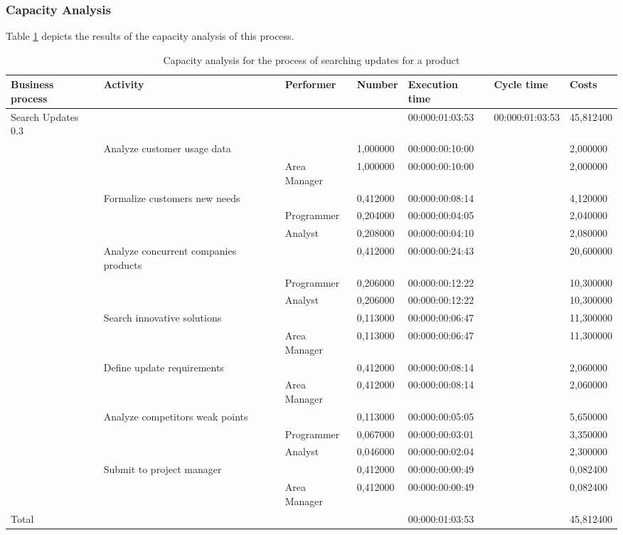 \subsubsection{Capacity Analysis}
Table \ref{2tab:updates} depicts the results of the capacity analysis of
this process.
\begin{landscape}
\centering
\begin{table}
{\tiny
\begin{tabular}{|l|l|l|l|l|l|l|}
Business process&Activity&Performer&Number&Execution time&Cycle
time&Costs\\
\hline
Search Updates 0.3&&&&00:000:01:03:53&00:000:01:03:53&45,812400\\
\hline
&Analyze customer usage data &&1,000000&00:000:00:10:00&&2,000000\\
\hline
&&Area Manager &1,000000&00:000:00:10:00&&2,000000\\
\hline
&Formalize customers new needs &&0,412000&00:000:00:08:14&&4,120000\\
\hline
&&Programmer &0,204000&00:000:00:04:05&&2,040000\\
\hline
&&Analyst &0,208000&00:000:00:04:10&&2,080000\\
\hline
&Analyze concurrent companies products &&0,412000&00:000:00:24:43&&20,600000\\
\hline
&&Programmer &0,206000&00:000:00:12:22&&10,300000\\
\hline
&&Analyst &0,206000&00:000:00:12:22&&10,300000\\
\hline
&Search innovative solutions &&0,113000&00:000:00:06:47&&11,300000\\
\hline
&&Area Manager &0,113000&00:000:00:06:47&&11,300000\\
\hline
&Define update requirements  &&0,412000&00:000:00:08:14&&2,060000\\
\hline
&&Area Manager &0,412000&00:000:00:08:14&&2,060000\\
\hline
&Analyze competitors weak points &&0,113000&00:000:00:05:05&&5,650000\\
\hline
&&Programmer &0,067000&00:000:00:03:01&&3,350000\\
\hline
&&Analyst &0,046000&00:000:00:02:04&&2,300000\\
\hline
&Submit to project manager &&0,412000&00:000:00:00:49&&0,082400\\
\hline
&&Area Manager &0,412000&00:000:00:00:49&&0,082400\\
\hline
Total&&&&00:000:01:03:53&&45,812400\\
\hline
\end{tabular}
}
\caption{Capacity analysis for the process of searching updates for a
product} 
\label{2tab:updates}
\end{table}
\end{landscape}



